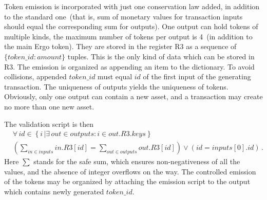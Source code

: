 Token emission is incorporated with just one conservation law added, in addition to the standard one~(that is,
sum of monetary values for transaction inputs should equal the corresponding sum for outputs). One output can
hold tokens of multiple kinds, the maximum number of tokens per output is 4~(in addition to the main Ergo token).
They are stored in the register R3 as a sequence of $\{token\_id: amount\}$ tuples. This is the only kind of data
which can be stored in R3.  The emission is organized as appending an item to
the dictionary. To avoid collisions, appended $token\_id$ must equal 
$id$ of the first input of the generating transaction. The uniqueness of outputs
yields the uniqueness of tokens. Obviously, only one output can contain a new asset, and a transaction
may create no more than one new asset.

 The validation script is then
\begin{eqnarray*}
    &\forall\,id\in \left\{ i\, | \exists\, out \in outputs : i\in out.R3.keys
    \right\} \nonumber\\
    &\left(\sum_{in\in inputs} in.R3[id] = \sum_{out\in
    outputs} out.R3[id] \right) \vee \left(id = inputs[0].id\right)\,.
\end{eqnarray*}
Here $\sum$ stands for the safe sum, which ensures non-negativeness of all the
values, and the absence of integer overflows on the way. The controlled emission of the
tokens may be organized by attaching the emission script to the output which contains newly generated $token\_id$.

